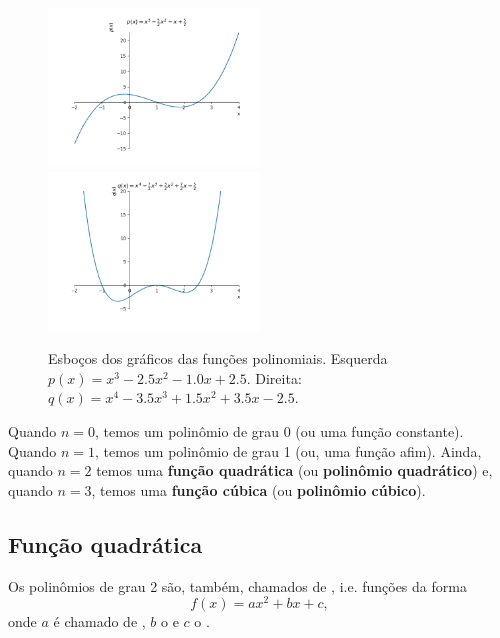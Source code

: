 \begin{figure}[H]
  \centering
  \includegraphics[width=0.5\textwidth]{./cap_funcao/dados/fig_poli_graficos/fig_poli_impar}~
    \includegraphics[width=0.5\textwidth]{./cap_funcao/dados/fig_poli_graficos/fig_poli_par}
  \caption{Esboços dos gráficos das funções polinomiais. Esquerda $p(x) = x^{3} - 2.5 x^{2} - 1.0 x + 2.5$. Direita: $q(x) = x^{4} - 3.5 x^{3} + 1.5 x^{2} + 3.5 x - 2.5$.}
  \label{fig:poli_graficos}
\end{figure}

Quando $n=0$, temos um polinômio de grau 0 (ou uma função constante). Quando $n=1$, temos um polinômio de grau 1 (ou, uma função afim). Ainda, quando $n=2$ temos uma {\bf função quadrática} (ou {\bf polinômio quadrático}) e, quando $n=3$, temos uma {\bf função cúbica} (ou {\bf polinômio cúbico}).

\subsection{Função quadrática}

Os polinômios de grau 2 são, também, chamados de , i.e. funções da forma
\begin{equation}
  f(x) = ax^2 + bx + c,
\end{equation}
onde $a$ é chamado de , $b$ o  e $c$ o .

